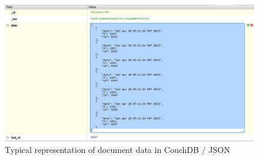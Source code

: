 \pagebreak

\begin{figure}[h]
	\begin{center}
	\includegraphics[width=120mm]{images/couchdb_json_ex}
	\caption{Typical representation of document data in CouchDB / JSON} 
	\label{couchdb_json_ex}
	\end{center}
\end{figure}
